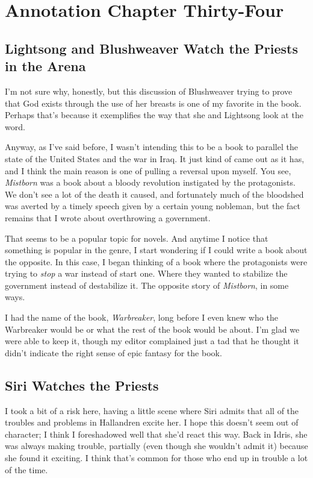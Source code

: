 \section{Annotation Chapter Thirty-Four}

\subsection*{Lightsong and Blushweaver Watch the Priests in the Arena}

I’m not sure why, honestly, but this discussion of Blushweaver trying to prove that God exists through the use of her breasts is one of my favorite in the book. Perhaps that’s because it exemplifies the way that she and Lightsong look at the word.

Anyway, as I’ve said before, I wasn’t intending this to be a book to parallel the state of the United States and the war in Iraq. It just kind of came out as it has, and I think the main reason is one of pulling a reversal upon myself. You see, \textit{Mistborn} was a book about a bloody revolution instigated by the protagonists. We don’t see a lot of the death it caused, and fortunately much of the bloodshed was averted by a timely speech given by a certain young nobleman, but the fact remains that I wrote about overthrowing a government.

That seems to be a popular topic for novels. And anytime I notice that something is popular in the genre, I start wondering if I could write a book about the opposite. In this case, I began thinking of a book where the protagonists were trying to \textit{stop} a war instead of start one. Where they wanted to stabilize the government instead of destabilize it. The opposite story of \textit{Mistborn}, in some ways.

I had the name of the book, \textit{Warbreaker}, long before I even knew who the Warbreaker would be or what the rest of the book would be about. I’m glad we were able to keep it, though my editor complained just a tad that he thought it didn’t indicate the right sense of epic fantasy for the book.

\subsection*{Siri Watches the Priests}

I took a bit of a risk here, having a little scene where Siri admits that all of the troubles and problems in Hallandren excite her. I hope this doesn’t seem out of character; I think I foreshadowed well that she’d react this way. Back in Idris, she was always making trouble, partially (even though she wouldn’t admit it) because she found it exciting. I think that’s common for those who end up in trouble a lot of the time.

